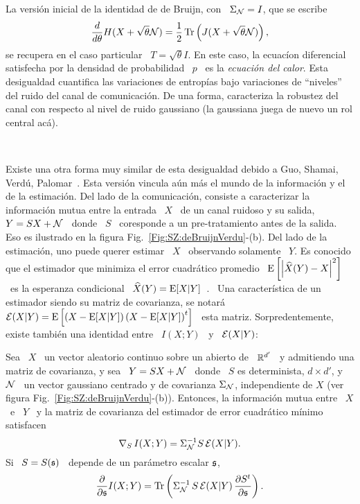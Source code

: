 La versi\'on  inicial de la identidad de  de Bruijn, con \  $\Sigma_{\mathcal{N}} = I$,
que se escribe
%
\[
\frac{d}{d\theta}     H(X+\sqrt{\theta}    \mathcal{N})    =     \frac12    \operatorname{Tr}\left(
  J(X+\sqrt{\theta} \mathcal{N}) \right),
\]
%
se recupera  en el caso particular  \ $T =  \sqrt{\theta} I$.  En este  caso, la
ecuac\'ion diferencial satisfecha por la densidad  de probabilidad \ $p$ \ es la
{\it  ecuaci\'on del  calor}.  Esta  desigualdad cuantifica  las  variaciones de
entrop\'ias   bajo  variaciones   de  ``niveles''   del  ruido   del   canal  de
comunicaci\'on. De una  forma, caracteriza la robustez del  canal con respecto al
nivel de ruido gaussiano (la gaussiana juega de nuevo un rol central ac\'a).

\

Existe una  otra forma  muy similar  de esta desigualdad  debido a  Guo, Shamai,
Verd\'u,  Palomar~\cite{GuoSha05, PalVer06,  TorZoz18}.  Esta  versi\'on vincula
a\'un m\'as el mundo  de la informaci\'on y el de la  estimaci\'on.  Del lado de
la  comunicaci\'on, consiste  a  caracterizar la  informaci\'on  mutua entre  la
entrada \ $X$ \ de un canal ruidoso y su  salida, \ $Y = S X + \mathcal{N}$ \ donde \
$S$ \ coresponde a un pre-tratamiento antes de la salida. Eso es ilustrado en la
figura  Fig.~\ref{Fig:SZ:deBruijnVerdu}-(b).  Del lado  de la  estimaci\'on, uno
puede querer  estimar \ $X$  \ observando solamente  \ $Y$.  Es conocido  que el
estimador  que minimiza  el error  cuadr\'atico promedio  \  $\operatorname{E}\left[ \left|
    \widehat{X}(Y)  - X  \right|^2 \right]$  \  es la  esperanza condicional  \
$\widehat{X}(Y)   =    \operatorname{E}[X|Y]$~\cite{Kay93,   Rob07,   LehCas98}.     \   Una
caracter\'istica de un  estimador siendo su matriz de  covarianza, se notar\'a \
$\mathcal{E}(X|Y)  =  \operatorname{E}\left[  \left( X  -  \operatorname{E}[X|Y]  \right)  \left( X  -  \operatorname{E}[X|Y]
  \right)^t  \right]$ \  esta  matriz.  Sorpredentemente,  existe tambi\'en  una
identidad entre \ $I(X;Y)$ \ y \ $\mathcal{E}(X|Y)$:
%
\begin{teorema}[Identidad de Guo--Shamai--Verd\'u]
\label{Teo:SZ:GuoShamaiVerdu}
%
  Sea \ $X$ \ un vector aleatorio  continuo sobre un abierto de \ $\mathbb{R}^{d'}$ \
  y admitiendo una  matriz de covarianza, y sea \  $Y = S X +  \mathcal{N}$ \ donde \
  $S$  es determinista,  $d  \times d'$,  y  \ $\mathcal{N}$  \  un vector  gaussiano
  centrado  y de covarianza  $\Sigma_{\mathcal{N}}$, independiente  de $X$  (ver figura
  Fig.~\ref{Fig:SZ:deBruijnVerdu}-(b)). Entonces, la informaci\'on mutua entre \
  $X$ \ e \ $Y$ \ y  la matriz de covarianza del estimador de error cuadr\'atico
  m\'inimo satisfacen
  \[
  \nabla_S \, I(X;Y) = \Sigma_{\mathcal{N}}^{-1} S \, \mathcal{E}(X|Y).
  \]
  Si \ $S = S(\mathfrak{s})$ \ depende de un par\'ametro escalar $\mathfrak{s}$,
  \[
  \frac{\partial}{\partial \mathfrak{s}} I(X;Y) = \operatorname{Tr}\left( \Sigma_{\mathcal{N}}^{-1} \, S \,
    \mathcal{E}(X|Y) \, \frac{\partial S^t}{\partial \mathfrak{s}} \right).
  \]
\end{teorema}
